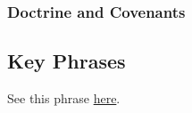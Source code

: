 		
		
	\subsubsection{Doctrine and Covenants} %
		\label{ADAM-DC}
	
		
		\begin{compactdesc}
			\item[{\hyperref[DC84:16]{DC 84:16}}]
		\end{compactdesc}
		
	
		
		
\subsection{Key Phrases} %
	\label{ADAM-PHRASES}

	\begin{compactdesc}
		\item[transgression of Adam] See this phrase \hyperref[TRANSGRESSION-PHRASES]{here}.
		\item[curse of Adam]
	\end{compactdesc}
	


